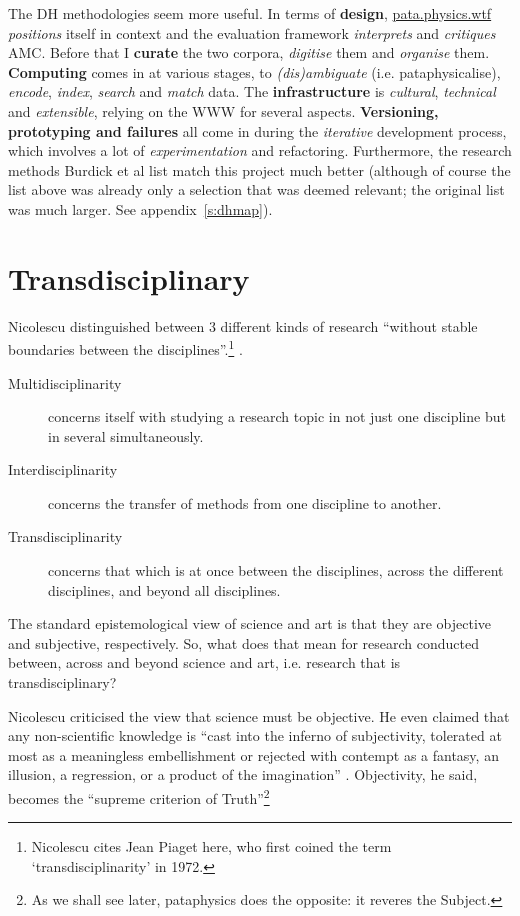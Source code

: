The \ac{DH} methodologies seem more useful. In terms of \textbf{design}, \url{pata.physics.wtf} \textit{positions} itself in context and the evaluation framework \textit{interprets} and \textit{critiques} \ac{AMC}. Before that I \textbf{curate} the two corpora, \textit{digitise} them and \textit{organise} them. \textbf{Computing} comes in at various stages, to \textit{(dis)ambiguate} (i.e. pataphysicalise), \textit{encode}, \textit{index}, \textit{search} and \textit{match} data. The \textbf{infrastructure} is \textit{cultural}, \textit{technical} and \textit{extensible}, relying on the \ac{WWW} for several aspects. \textbf{Versioning, prototyping and failures} all come in during the \textit{iterative} development process, which involves a lot of \textit{experimentation} and refactoring. Furthermore, the research methods Burdick et al \autocite*{Burdick2012} list match this project much better (although of course the list above was already only a selection that was deemed relevant; the original list was much larger. See appendix~\ref{s:dhmap}).


\section{Transdisciplinary}

Nicolescu distinguished between 3 different kinds of research ``without stable boundaries between the disciplines''.\footnote{Nicolescu cites Jean Piaget here, who first coined the term `transdisciplinarity' in 1972.} \autocite*{Nicolescu2010}.

\begin{description}
  \item [Multidisciplinarity]	concerns itself with studying a research topic in not just one discipline but in several simultaneously.
  \item [Interdisciplinarity]	concerns the transfer of methods from one discipline to another.
  \item [Transdisciplinarity]	concerns that which is at once between the disciplines, across the different disciplines, and beyond all disciplines.
\end{description}

The standard epistemological view of science and art is that they are objective and subjective, respectively. So, what does that mean for research conducted between, across and beyond science and art, i.e. research that is transdisciplinary?

Nicolescu criticised the view that science must be objective. He even claimed that any non-scientific knowledge is ``cast into the inferno of subjectivity, tolerated at most as a meaningless embellishment or rejected with contempt as a fantasy, an illusion, a regression, or a product of the imagination'' \autocite*{Nicolescu2010}. Objectivity, he said, becomes the ``supreme criterion of Truth''\footnote{As we shall see later, pataphysics does the opposite: it reveres the Subject.}

